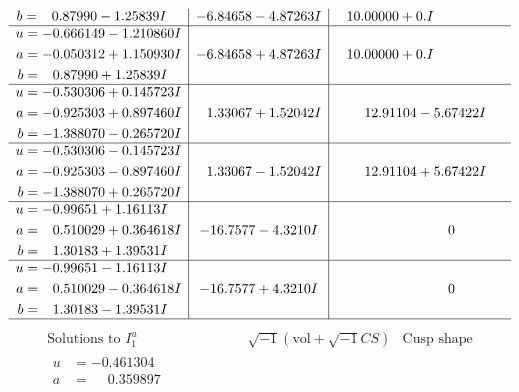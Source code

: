 \documentclass[1p]{elsarticle_modified}
\theoremstyle{definition}
\newcommand{\I}{\sqrt{-1}}
\begin{document}
$$\begin{array}{c|c|c}
\begin{aligned}
b &= \phantom{-}0.87990 - 1.25839 I\end{aligned}
 & -6.84658 - 4.87263 I & \phantom{-}10.00000 + 0. I\phantom{ +0.000000I} \\ \hline\begin{aligned}
u &= -0.666149 - 1.210860 I \\
a &= -0.050312 + 1.150930 I \\
b &= \phantom{-}0.87990 + 1.25839 I\end{aligned}
 & -6.84658 + 4.87263 I & \phantom{-}10.00000 + 0. I\phantom{ +0.000000I} \\ \hline\begin{aligned}
u &= -0.530306 + 0.145723 I \\
a &= -0.925303 + 0.897460 I \\
b &= -1.388070 - 0.265720 I\end{aligned}
 & \phantom{-}1.33067 + 1.52042 I & \phantom{-}12.91104 - 5.67422 I \\ \hline\begin{aligned}
u &= -0.530306 - 0.145723 I \\
a &= -0.925303 - 0.897460 I \\
b &= -1.388070 + 0.265720 I\end{aligned}
 & \phantom{-}1.33067 - 1.52042 I & \phantom{-}12.91104 + 5.67422 I \\ \hline\begin{aligned}
u &= -0.99651 + 1.16113 I \\
a &= \phantom{-}0.510029 + 0.364618 I \\
b &= \phantom{-}1.30183 + 1.39531 I\end{aligned}
 & -16.7577 - 4.3210 I & \phantom{-0.000000 } 0 \\ \hline\begin{aligned}
u &= -0.99651 - 1.16113 I \\
a &= \phantom{-}0.510029 - 0.364618 I \\
b &= \phantom{-}1.30183 - 1.39531 I\end{aligned}
 & -16.7577 + 4.3210 I & \phantom{-0.000000 } 0\\
 \hline 
 \end{array}$$\newpage$$\begin{array}{c|c|c}  
\text{Solutions to }I^u_{1}& \I (\text{vol} + \sqrt{-1}CS) & \text{Cusp shape}\\
 \hline 
\begin{aligned}
u &= -0.461304\phantom{ +0.000000I} \\
a &= \phantom{-}0.359897\phantom{ +0.000000I} \\

\end{aligned}
\end{array}$$
\end{document}
